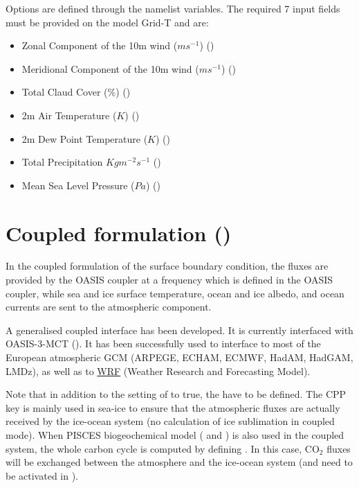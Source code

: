 \documentclass[../tex_main/NEMO_manual]{subfiles}
\begin{document}
Options are defined through the  namelist variables.
The required 7 input fields must be provided on the model Grid-T and are:
\begin{itemize}
\item          Zonal Component of the 10m wind ($ms^{-1}$)  ()
\item          Meridional Component of the 10m wind ($ms^{-1}$)  ()
\item          Total Claud Cover (\%)  ()
\item          2m Air Temperature ($K$) ()
\item          2m Dew Point Temperature ($K$)  ()
\item          Total Precipitation ${Kg} m^{-2} s^{-1}$ ()
\item          Mean Sea Level Pressure (${Pa}$) ()
\end{itemize}
\section{Coupled formulation (\protect{})}
\label{sec:SBC_cpl}


In the coupled formulation of the surface boundary condition,
the fluxes are provided by the OASIS coupler at a frequency which is defined in the OASIS coupler,
while sea and ice surface temperature, ocean and ice albedo, and ocean currents are sent to
the atmospheric component.

A generalised coupled interface has been developed.
It is currently interfaced with OASIS-3-MCT ().
It has been successfully used to interface \NEMO to most of the European atmospheric GCM
(ARPEGE, ECHAM, ECMWF, HadAM, HadGAM, LMDz), as well as to \href{http://wrf-model.org/}{WRF}
(Weather Research and Forecasting Model).

Note that in addition to the setting of  to true, the  have to be defined.
The CPP key is mainly used in sea-ice to ensure that the atmospheric fluxes are actually received by
the ice-ocean system (no calculation of ice sublimation in coupled mode).
When PISCES biogeochemical model ( and ) is also used in the coupled system, 
the whole carbon cycle is computed by defining .
In this case, CO$_2$ fluxes will be exchanged between the atmosphere and the ice-ocean system
(and need to be activated in  ).
\end{document}

